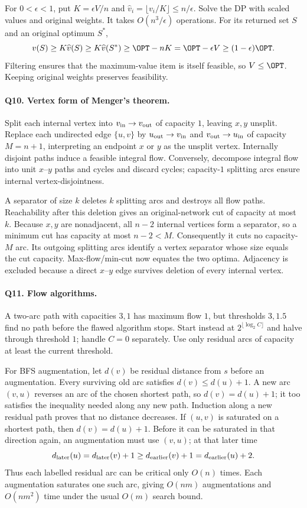 For $0<\epsilon<1$, put $K=\epsilon V/n$ and
$\widehat v_i=\lfloor v_i/K\rfloor\le n/\epsilon$.  Solve the DP with
scaled values and original weights.  It takes $O(n^3/\epsilon)$ operations.
For its returned set $S$ and an original optimum $S^*$,
\[
v(S)\ge K\widehat v(S)\ge K\widehat v(S^*)
\ge\OPT-nK=\OPT-\epsilon V\ge(1-\epsilon)\OPT.
\]
Filtering ensures that the maximum-value item is itself feasible, so
$V\le\OPT$.  Keeping original weights preserves feasibility.

\paragraph{Q10. Vertex form of Menger's theorem.}
Split each internal vertex into $v_{\rm in}\to v_{\rm out}$ of capacity
$1$, leaving $x,y$ unsplit.  Replace each undirected edge $\{u,v\}$ by
$u_{\rm out}\to v_{\rm in}$ and $v_{\rm out}\to u_{\rm in}$ of capacity
$M=n+1$, interpreting an endpoint $x$ or $y$ as the unsplit vertex.
Internally disjoint paths induce a feasible integral flow.  Conversely,
decompose integral flow into unit $x$--$y$ paths and cycles and discard
cycles; capacity-$1$ splitting arcs ensure internal vertex-disjointness.

A separator of size $k$ deletes $k$ splitting arcs and destroys all flow
paths.  Reachability after this deletion gives an original-network cut
of capacity at most $k$.  Because $x,y$ are nonadjacent, all $n-2$ internal
vertices form a separator, so a minimum cut has capacity at most
$n-2<M$.  Consequently it cuts no capacity-$M$ arc.  Its outgoing splitting
arcs identify a vertex separator whose size equals the cut capacity.
Max-flow/min-cut now equates the two optima.  Adjacency is excluded because
a direct $x$--$y$ edge survives deletion of every internal vertex.

\paragraph{Q11. Flow algorithms.}
A two-arc path with capacities $3,1$ has maximum flow $1$, but thresholds
$3,1.5$ find no path before the flawed algorithm stops.  Start instead at
$2^{\lfloor\log_2 C\rfloor}$ and halve through threshold $1$; handle $C=0$
separately.  Use only residual arcs of capacity at least the current threshold.

For BFS augmentation, let $d(v)$ be residual distance from $s$ before an
augmentation.  Every surviving old arc satisfies $d(v)\le d(u)+1$.
A new arc $(v,u)$ reverses an arc of the chosen shortest path, so
$d(v)=d(u)+1$; it too satisfies the inequality needed along any new path.
Induction along a new residual path proves that no distance decreases.
If $(u,v)$ is saturated on a shortest path, then $d(v)=d(u)+1$.
Before it can be saturated in that direction again, an augmentation must
use $(v,u)$; at that later time
\[
d_{\rm later}(u)=d_{\rm later}(v)+1
\ge d_{\rm earlier}(v)+1=d_{\rm earlier}(u)+2.
\]
Thus each labelled residual arc can be critical only $O(n)$ times.
Each augmentation saturates one such arc, giving $O(nm)$ augmentations
and $O(nm^2)$ time under the usual $O(m)$ search bound.

